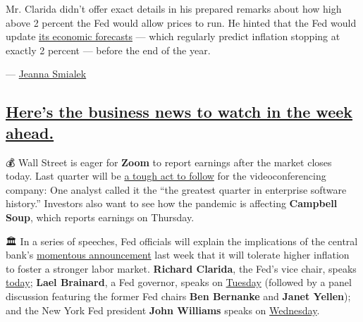 Mr. Clarida didn't offer exact details in his prepared remarks about how
high above 2 percent the Fed would allow prices to run. He hinted that
the Fed would update
\href{https://www.federalreserve.gov/monetarypolicy/files/fomcprojtabl20200610.pdf}{its
economic forecasts} --- which regularly predict inflation stopping at
exactly 2 percent --- before the end of the year.

--- \href{https://www.nytimes3xbfgragh.onion/by/jeanna-smialek}{Jeanna
Smialek}

\hypertarget{heres-the-business-news-to-watch-in-the-week-ahead}{%
\subsection{\texorpdfstring{\protect\hyperlink{heres-the-business-news-to-watch-in-the-week-ahead}{Here's
the business news to watch in the week
ahead.}}{Here's the business news to watch in the week ahead.}}\label{heres-the-business-news-to-watch-in-the-week-ahead}}

💰 Wall Street is eager for \textbf{Zoom} to report earnings after the
market closes today. Last quarter will be
\href{https://www.marketwatch.com/story/what-can-zoom-do-for-a-sequel-to-one-of-the-most-astounding-earnings-blowouts-of-all-time-11598724433}{a
tough act to follow} for the videoconferencing company: One analyst
called it the ``the greatest quarter in enterprise software history.''
Investors also want to see how the pandemic is affecting
\textbf{Campbell Soup}, which reports earnings on Thursday.

🏛 In a series of speeches, Fed officials will explain the implications
of the central bank's
\href{https://www.nytimes3xbfgragh.onion/2020/08/27/business/economy/federal-reserve-inflation-jerome-powell.html}{momentous
announcement} last week that it will tolerate higher inflation to foster
a stronger labor market. \textbf{Richard Clarida}, the Fed's vice chair,
speaks
\href{https://www.piie.com/events/fed-vice-chair-richard-h-clarida-us-monetary-policy}{today};
\textbf{Lael Brainard}, a Fed governor, speaks on
\href{https://www.brookings.edu/events/how-the-fed-will-respond-to-the-covid-19-recession-in-an-era-of-low-rates-and-low-inflation/}{Tuesday}
(followed by a panel discussion featuring the former Fed chairs
\textbf{Ben Bernanke} and \textbf{Janet Yellen}); and the New York Fed
president \textbf{John Williams} speaks on
\href{https://www.brettonwoods.org/event/in-conversation-ny-fed-presidents-on-covid19}{Wednesday}.

